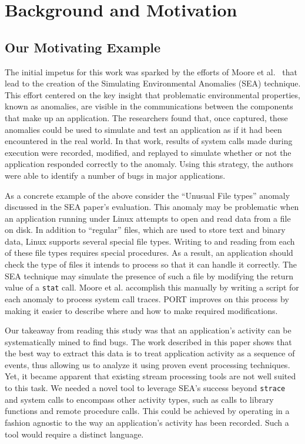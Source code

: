 \section{Background and Motivation}
\label{SEC:background}


\subsection{Our Motivating Example}
\label{sec:MotivatingExample}

The initial impetus for this work was sparked by the efforts of Moore et al.~\cite{DBLP:conf/issre/MooreCFW19}
that lead to the creation of
the Simulating Environmental Anomalies (SEA) technique.
This effort centered on the key insight
that problematic
environmental properties,
known as anomalies, are visible in the
communications between the components that make up an application.
The researchers found that,
once captured,
these anomalies
could be
used to simulate and 
test
an application as if
it had been encountered
in the real world.
In that work, results of system calls made
during execution were recorded, modified, and replayed to simulate whether or not the application
responded correctly to the anomaly.
Using this strategy, the authors were able to identify a number of bugs
in major applications.

As a concrete example of the above
consider the ``Unusual File types'' anomaly
discussed in the SEA paper's evaluation.
This anomaly may be problematic
when an application running under Linux
attempts to open and read data from a file on disk.
In addition to ``regular'' files,
which are used to store text and
binary data,
Linux supports several special file types.
Writing to and
reading from each of these file types requires special procedures.
As a result, an application should check the type of files it intends to
process so that it can handle it correctly.
The SEA technique
may simulate the presence of such a file by
modifying
the return value
of a {\tt stat} call.
Moore et al. accomplish this manually
by writing a script
for each anomaly
to process system call traces.
PORT improves on this process by
making it easier to describe
where and how to make required modifications.

Our takeaway
from reading this study
was that an application's activity
can be systematically mined to find bugs.
The work described in this paper
shows that the best way to extract this data
is to treat application activity
as a sequence of events,
thus allowing us to analyze it using
proven event processing techniques. 
Yet, it became apparent that existing
stream processing tools
are not well suited to this task. We needed a 
novel tool to leverage
SEA's success beyond {\tt strace} and system calls to encompass other activity types,
such as calls to library functions
and remote procedure calls.
This could be achieved by operating in a fashion agnostic to the way an application's activity has been recorded. Such a tool would require a distinct language. 


